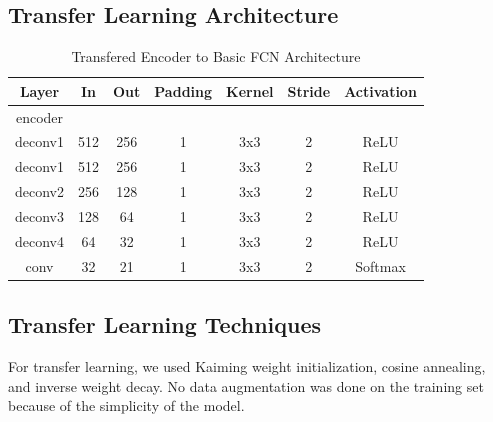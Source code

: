 \subsection*{Transfer Learning Architecture}
\begin{table}[H]
	\centering
	\label{tab:transfer}
	\setlength{\abovecaptionskip}{10pt}
	\begin{tabular}{|c|c|c|c|c|c|c|}
		\hline
		\textbf{Layer} & \textbf{In} & \textbf{Out} & \textbf{Padding} & \textbf{Kernel} & \textbf{Stride} & \textbf{Activation} \\ \hline
		encoder        &             &              &                  &                 &                 &                     \\ \hline
		deconv1        & 512         & 256          & 1                & 3x3             & 2               & ReLU                \\ \hline
		deconv1        & 512         & 256          & 1                & 3x3             & 2               & ReLU                \\ \hline
		deconv2        & 256         & 128          & 1                & 3x3             & 2               & ReLU                \\ \hline
		deconv3        & 128         & 64           & 1                & 3x3             & 2               & ReLU                \\ \hline
		deconv4        & 64          & 32           & 1                & 3x3             & 2               & ReLU                \\ \hline
		conv           & 32          & 21           & 1                & 3x3             & 2               & Softmax             \\ \hline
	\end{tabular}
	\caption{Transfered Encoder to Basic FCN Architecture}
\end{table}

\subsection*{Transfer Learning Techniques}
For transfer learning, we used Kaiming weight initialization, cosine annealing, and inverse weight decay. No data augmentation was done on the training set because of the simplicity of the model.

